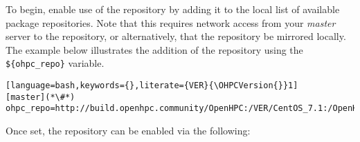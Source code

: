 To begin, enable use of the \OHPC{} repository by adding it to the local list of
available package repositories.  Note that this requires network access from
your {\em master} server to the \OHPC{} repository, or alternatively, that
the \OHPC{} repository be mirrored locally. The example below illustrates the addition
of the \OHPC{} repository using the \texttt{\$\{ohpc\_repo\}}
variable.

\begin{lstlisting}[language=bash,keywords={},literate={VER}{\OHPCVersion{}}1]
[master](*\#*) ohpc_repo=http://build.openhpc.community/OpenHPC:/VER/CentOS_7.1:/OpenHPC:VER.repo
\end{lstlisting}

Once set, the repository can be enabled via the following: 






